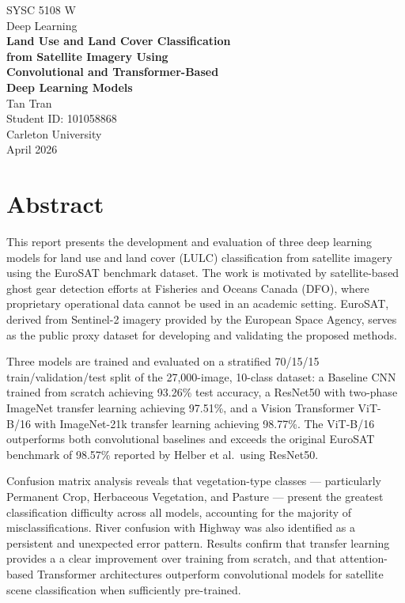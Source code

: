 \documentclass[12pt, letterpaper]{article}
\begin{document}
\begin{titlepage}
    \centering
    \vspace*{2cm}
    {\large SYSC 5108 W}\\[0.3cm]
    {\large Deep Learning}\\[1.5cm]
    {\LARGE \textbf{Land Use and Land Cover Classification\\[0.3cm]
    from Satellite Imagery Using\\[0.3cm]
    Convolutional and Transformer-Based\\[0.3cm]
    Deep Learning Models}}\\[2cm]
    {\large Tan Tran}\\[0.2cm]
    {\normalsize Student ID: 101058868}\\[0.3cm]
    {\normalsize Carleton University}\\[2cm]
    {\normalsize April 2026}
\end{titlepage}

\newpage
\section*{Abstract}

This report presents the development and evaluation of three deep learning models for
land use and land cover (LULC) classification from satellite imagery using the EuroSAT
benchmark dataset. The work is motivated by satellite-based ghost gear detection efforts
at Fisheries and Oceans Canada (DFO), where proprietary operational data cannot be used
in an academic setting. EuroSAT, derived from Sentinel-2 imagery provided by the
European Space Agency, serves as the public proxy dataset for developing and validating
the proposed methods.

Three models are trained and evaluated on a stratified 70/15/15 train/validation/test
split of the 27,000-image, 10-class dataset: a Baseline CNN trained from scratch
achieving 93.26\% test accuracy, a ResNet50 with two-phase ImageNet transfer learning
achieving 97.51\%, and a Vision Transformer ViT-B/16 with ImageNet-21k transfer learning
achieving 98.77\%. The ViT-B/16 outperforms both convolutional baselines and exceeds the
original EuroSAT benchmark of 98.57\% reported by Helber et al.\ using ResNet50.

Confusion matrix analysis reveals that vegetation-type classes --- particularly
Permanent Crop, Herbaceous Vegetation, and Pasture --- present the greatest
classification difficulty across all models, accounting for the majority of
misclassifications. River confusion with Highway was also identified as a persistent
and unexpected error pattern. Results confirm that transfer learning provides a
a clear improvement over training from scratch, and that attention-based Transformer
architectures outperform convolutional models for satellite scene classification when
sufficiently pre-trained.
\end{document}
